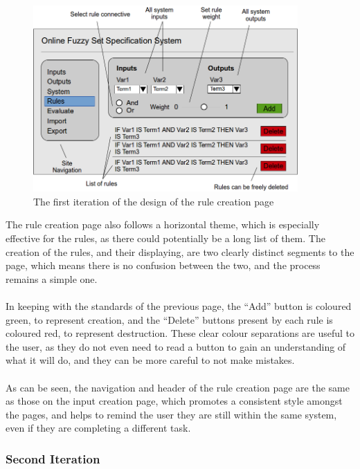 \begin{figure}[ht!]	
\begin{center}
\includegraphics[width=0.9\textwidth]{images/firstItRules}
\end{center}
\vspace{-5mm}	
\caption{The first iteration of the design of the rule creation page}
\label{fig:design-firstIterationRules}
\end{figure}
\noindent 
The rule creation page also follows a horizontal theme, which is especially effective for the rules, as there could potentially be a long list of them. The creation of the rules, and their displaying, are two clearly distinct segments to the page, which means there is no confusion between the two, and the process remains a simple one.\ \\
\ \\
In keeping with the standards of the previous page, the ``Add'' button is coloured green, to represent creation, and the ``Delete'' buttons present by each rule is coloured red, to represent destruction. These clear colour separations are useful to the user, as they do not even need to read a button to gain an understanding of what it will do, and they can be more careful to not make mistakes.\ \\
\ \\
As can be seen, the navigation and header of the rule creation page are the same as those on the input creation page, which promotes a consistent style amongst the pages, and helps to remind the user they are still within the same system, even if they are completing a different task. 





\subsubsection{Second Iteration}

